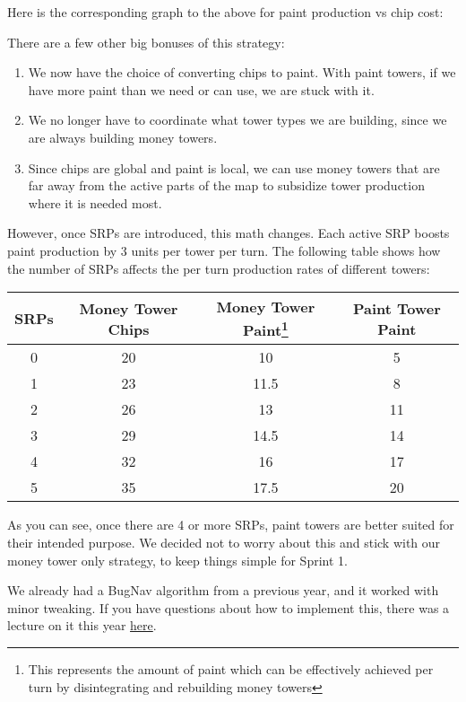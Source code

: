 \documentclass{article}
\begin{document}
  \medskip

  Here is the corresponding graph to the above for paint production vs chip cost:
  \begin{center}
  \end{center}
  There are a few other big bonuses of this strategy:
  \begin{enumerate}
    \item We now have the choice of converting chips to paint. With paint towers, if we have more paint than we need or can use, we are stuck with it.
    \item We no longer have to coordinate what tower types we are building, since we are always building money towers.
    \item Since chips are global and paint is local, we can use money towers that are far away from the active parts of the map to subsidize tower production where it is needed most.
  \end{enumerate}
  However, once SRPs are introduced, this math changes. Each active SRP boosts paint production by 3 units per tower per turn. The following table shows how the number of SRPs affects the per turn production rates of different towers:
  \begin{center}
    \begin{tabular}{c | c | c | c}
      SRPs & Money Tower Chips & Money Tower Paint\footnote{This represents the amount of paint which can be effectively achieved per turn by disintegrating and rebuilding money towers} & Paint Tower Paint \\
      \hline
      0 & 20 & 10 & 5 \\
      1 & 23 & 11.5 & 8 \\
      2 & 26 & 13 & 11 \\
      3 & 29 & 14.5 & 14 \\
      4 & 32 & 16 & 17 \\
      5 & 35 & 17.5 & 20
    \end{tabular}
  \end{center}
  As you can see, once there are 4 or more SRPs, paint towers are better suited for their intended purpose. We decided not to worry about this and stick with our money tower only strategy, to keep things simple for Sprint 1.

  \medskip
  
  We already had a BugNav algorithm from a previous year, and it worked with minor tweaking. If you have questions about how to implement this, there was a lecture on it this year \href{https://www.youtube.com/live/Mqk50BQH3oQ?si=6qL5WAXmSOS2K3OR}{here}.
\end{document}
